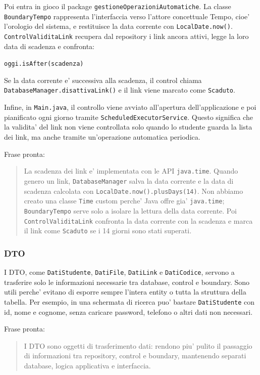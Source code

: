 ﻿\documentclass[11pt,a4paper]{article}
\begin{document}
Poi entra in gioco il package \texttt{gestioneOperazioniAutomatiche}. La classe
\texttt{BoundaryTempo} rappresenta l'interfaccia verso l'attore concettuale Tempo, cioe'
l'orologio del sistema, e restituisce la data corrente con \texttt{LocalDate.now()}.
\texttt{ControlValiditaLink} recupera dal repository i link ancora attivi, legge la loro
data di scadenza e confronta:
\begin{center}
\texttt{oggi.isAfter(scadenza)}
\end{center}
Se la data corrente e' successiva alla scadenza, il control chiama
\texttt{DatabaseManager.disattivaLink()} e il link viene marcato come \texttt{Scaduto}.

Infine, in \texttt{Main.java}, il controllo viene avviato all'apertura dell'applicazione e
poi pianificato ogni giorno tramite \texttt{ScheduledExecutorService}. Questo significa che
la validita' del link non viene controllata solo quando lo studente guarda la lista dei
link, ma anche tramite un'operazione automatica periodica.

Frase pronta:
\begin{quote}
La scadenza dei link e' implementata con le API \texttt{java.time}. Quando genero un link,
\texttt{DatabaseManager} salva la data corrente e la data di scadenza calcolata con
\texttt{LocalDate.now().plusDays(14)}. Non abbiamo creato una classe \texttt{Time} custom
perche' Java offre gia' \texttt{java.time}; \texttt{BoundaryTempo} serve solo a isolare la
lettura della data corrente. Poi \texttt{ControlValiditaLink} confronta la data corrente
con la scadenza e marca il link come \texttt{Scaduto} se i 14 giorni sono stati superati.
\end{quote}

\subsubsection{DTO}

I DTO, come \texttt{DatiStudente}, \texttt{DatiFile}, \texttt{DatiLink} e
\texttt{DatiCodice}, servono a trasferire solo le informazioni necessarie tra database,
control e boundary. Sono utili perche' evitano di esporre sempre l'intera entity o tutta la
struttura della tabella. Per esempio, in una schermata di ricerca puo' bastare
\texttt{DatiStudente} con id, nome e cognome, senza caricare password, telefono o altri
dati non necessari.

Frase pronta:
\begin{quote}
I DTO sono oggetti di trasferimento dati: rendono piu' pulito il passaggio di informazioni
tra repository, control e boundary, mantenendo separati database, logica applicativa e
interfaccia.
\end{quote}
\end{document}
